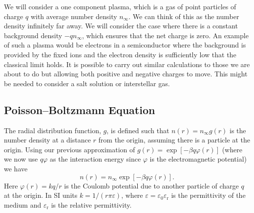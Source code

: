 \documentclass[fleqn]{NotesClass}
\begin{document}
    We will consider a one component plasma, which is a gas of point particles of charge \(q\) with average number density \(n_{\infty}\).
    We can think of this as the number density infinitely far away.
    We will consider the case where there is a constant background density \(-qn_{\infty}\), which ensures that the net charge is zero.
    An example of such a plasma would be electrons in a semiconductor where the background is provided by the fixed ions and the electron density is sufficiently low that the classical limit holds.
    It is possible to carry out similar calculations to those we are about to do but allowing both positive and negative charges to move.
    This might be needed to consider a salt solution or interstellar gas.
    
    \subsection{Poisson--Boltzmann Equation}
    The radial distribution function, \(g\), is defined such that \(n(r) = n_{\infty}g(r)\) is the number density at a distance \(r\) from the origin, assuming there is a particle at the origin.
    Using our previous approximation of \(g(r) = \exp[-\beta q\varphi(r)]\) (where we now use \(q\varphi\) as the interaction energy since \(\varphi\) is the electromagnetic potential) we have
    \begin{equation}
        n(r) = n_{\infty} \exp[-\beta q \varphi(r)].
    \end{equation}
    Here \(\varphi(r) = kq/r\) is the Coulomb potential due to another particle of charge \(q\) at the origin.
    In SI units \(k = 1/(r\pi\varepsilon)\), where \(\varepsilon = \varepsilon_0 \varepsilon_{\mathrm{r}}\) is the permittivity of the medium and \(\varepsilon_{\mathrm{r}}\) is the relative permittivity.
    
\end{document}
